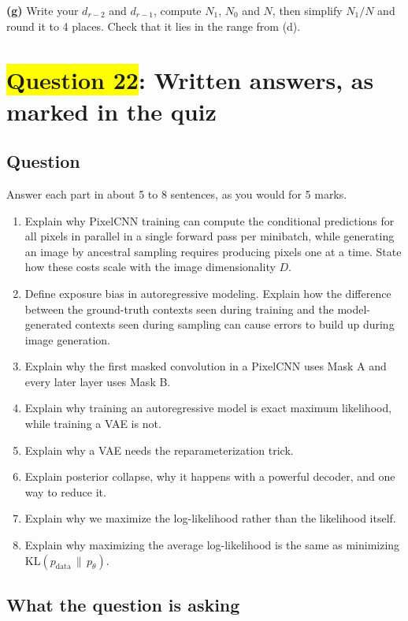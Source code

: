 \documentclass[12pt,a4paper]{article}
\begin{document}
\textbf{(g)} Write your $d_{r-2}$ and $d_{r-1}$, compute $N_1$, $N_0$ and $N$, then simplify $N_1/N$ and round it to 4 places. Check that it lies in the range from (d).
\newpage
\section{\texorpdfstring{\colorbox{yellow}{Question 22}}{Question 22}: Written answers, as marked in the quiz}

\subsection{Question}

Answer each part in about 5 to 8 sentences, as you would for 5 marks.
\begin{enumerate}[label=(\alph*)]
  \item[\colorbox{yellow}{(a)}] Explain why PixelCNN training can compute the conditional predictions for all pixels in parallel in a single forward pass per minibatch, while generating an image by ancestral sampling requires producing pixels one at a time. State how these costs scale with the image dimensionality $D$.
  \item Define exposure bias in autoregressive modeling. Explain how the difference between the ground-truth contexts seen during training and the model-generated contexts seen during sampling can cause errors to build up during image generation.
  \item Explain why the first masked convolution in a PixelCNN uses Mask A and every later layer uses Mask B.
  \item Explain why training an autoregressive model is exact maximum likelihood, while training a VAE is not.
  \item Explain why a VAE needs the reparameterization trick.
  \item Explain posterior collapse, why it happens with a powerful decoder, and one way to reduce it.
  \item Explain why we maximize the log-likelihood rather than the likelihood itself.
  \item Explain why maximizing the average log-likelihood is the same as minimizing $\mathrm{KL}(p_{\text{data}}\,\|\,p_\theta)$.
\end{enumerate}

\subsection{What the question is asking}
\end{document}
